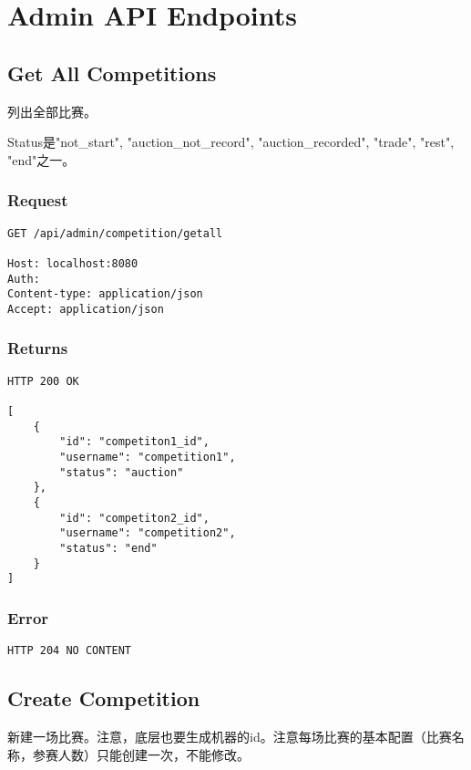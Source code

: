 \documentclass{article}
\begin{document}
\section{Admin API Endpoints}
\subsection{Get All Competitions}

列出全部比赛。

Status是"not\_start", "auction\_not\_record", "auction\_recorded", "trade", "rest", "end"之一。

\subsubsection*{Request}
\begin{lstlisting}
GET /api/admin/competition/getall

Host: localhost:8080
Auth:
Content-type: application/json
Accept: application/json
\end{lstlisting}

\subsubsection*{Returns}
\begin{lstlisting}
HTTP 200 OK

[
	{
	    "id": "competiton1_id",
	    "username": "competition1",
	    "status": "auction"
	},
	{
	    "id": "competiton2_id",
	    "username": "competition2",
	    "status": "end"
	}
]
\end{lstlisting}

\subsubsection*{Error}
\begin{lstlisting}
HTTP 204 NO CONTENT
\end{lstlisting}

\subsection{Create Competition}
新建一场比赛。注意，底层也要生成机器的id。注意每场比赛的基本配置（比赛名称，参赛人数）只能创建一次，不能修改。
\end{document}
